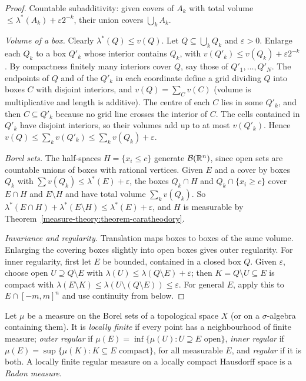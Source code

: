 \begin{proof}
Countable subadditivity: given covers of $A_k$ with total volume $\leq \lambda^*(A_k) + \varepsilon2^{-k}$, their union covers $\bigcup_kA_k$.

\emph{Volume of a box.} Clearly $\lambda^*(Q) \leq v(Q)$. Let $Q \subseteq \bigcup_kQ_k$ and $\varepsilon > 0$. Enlarge each $Q_k$ to a box $Q'_k$ whose interior contains $Q_k$, with
$v(Q'_k) \leq v(Q_k) + \varepsilon2^{-k}$. By compactness finitely many interiors cover $Q$, say those of $Q'_1, \ldots, Q'_N$. The endpoints of $Q$ and of the $Q'_k$ in each coordinate define a grid
dividing $Q$ into boxes $C$ with disjoint interiors, and $v(Q) = \sum_Cv(C)$ (volume is multiplicative and length is additive). The centre of each $C$ lies in some $Q'_k$, and then $C \subseteq Q'_k$ because
no grid line crosses the interior of $C$. The cells contained in $Q'_k$ have disjoint interiors, so their volumes add up to at most $v(Q'_k)$. Hence $v(Q) \leq \sum_kv(Q'_k) \leq \sum_kv(Q_k) + \varepsilon$.

\emph{Borel sets.} The half-spaces $H = \{x_i \leq c\}$ generate $\mathcal{B}(\mathbb{R}^n)$, since open sets are countable unions of boxes with rational vertices. Given $E$ and a cover by boxes $Q_k$ with
$\sum v(Q_k) \leq \lambda^*(E) + \varepsilon$, the boxes $Q_k \cap H$ and $Q_k \cap \{x_i \geq c\}$ cover $E \cap H$ and $E \setminus H$ and have total volume $\sum_kv(Q_k)$. So
$\lambda^*(E \cap H) + \lambda^*(E \setminus H) \leq \lambda^*(E) + \varepsilon$, and $H$ is measurable by Theorem~\ref{measure-theory:theorem-caratheodory}.

\emph{Invariance and regularity.} Translation maps boxes to boxes of the same volume. Enlarging the covering boxes slightly into open boxes gives outer regularity. For inner regularity, first let $E$ be bounded, contained in a
closed box $Q$. Given $\varepsilon$, choose open $U \supseteq Q \setminus E$ with $\lambda(U) \leq \lambda(Q \setminus E) + \varepsilon$; then $K = Q \setminus U \subseteq E$ is compact with
$\lambda(E \setminus K) \leq \lambda(U \setminus (Q \setminus E)) \leq \varepsilon$. For general $E$, apply this to $E \cap [-m, m]^n$ and use continuity from below.
\end{proof}

\begin{definition}\label{measure-theory:definition-regular}
Let $\mu$ be a measure on the Borel sets of a topological space $X$ (or on a $\sigma$-algebra containing them). It is \emph{locally finite} if every point has a neighbourhood of finite measure;
\emph{outer regular} if $\mu(E) = \inf\{\mu(U) : U \supseteq E \text{ open}\}$, \emph{inner regular} if $\mu(E) = \sup\{\mu(K) : K \subseteq E \text{ compact}\}$, for all measurable $E$, and
\emph{regular} if it is both. A locally finite regular measure on a locally compact Hausdorff space is a \emph{Radon measure}.
\end{definition}

